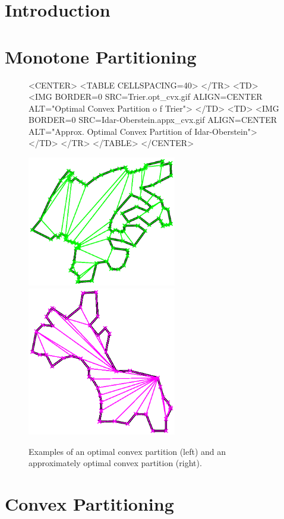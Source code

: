 



\section{Introduction}
\label{sec:partition_2_intro}


\section{Monotone Partitioning}
\label{sec:partition_2_monotone}


\begin{figure}
\begin{ccHtmlOnly}
<CENTER>
<TABLE CELLSPACING=40>
</TR>
<TD>
<IMG BORDER=0 SRC=Trier.opt_cvx.gif ALIGN=CENTER ALT="Optimal Convex Partition o
f Trier">
</TD>
<TD>
<IMG BORDER=0 SRC=Idar-Oberstein.appx_cvx.gif ALIGN=CENTER ALT="Approx. Optimal
Convex Partition of Idar-Oberstein">
</TD>
</TR>
</TABLE>
</CENTER>
\end{ccHtmlOnly}

\begin{ccTexOnly}
\begin{center}
\includegraphics[width=6.5cm]{Partition_2/Trier.opt_cvx.ps}
\includegraphics[width=6.5cm]{Partition_2/Idar-Oberstein.appx_cvx.ps}
\end{center}
\end{ccTexOnly}
\caption{Examples of an optimal convex partition (left) and an approximately
optimal convex partition (right).}
\end{figure}


\section{Convex Partitioning}
\label{sec:partition_2_convex}


